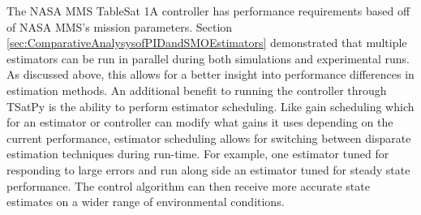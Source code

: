 The NASA MMS TableSat 1A controller has performance requirements based off of NASA MMS's mission parameters.  Section \ref{sec:ComparativeAnalysysofPIDandSMOEstimators} demonstrated that multiple estimators can be run in parallel during both simulations and experimental runs.  As discussed above, this allows for a better insight into performance differences in estimation methods.  An additional benefit to running the controller through TSatPy is the ability to perform estimator scheduling.  Like gain scheduling which for an estimator or controller can modify what gains it uses depending on the current performance, estimator scheduling allows for switching between disparate estimation techniques during run-time.  For example, one estimator tuned for responding to large errors and run along side an estimator tuned for steady state performance.  The control algorithm can then receive more accurate state estimates on a wider range of environmental conditions.
